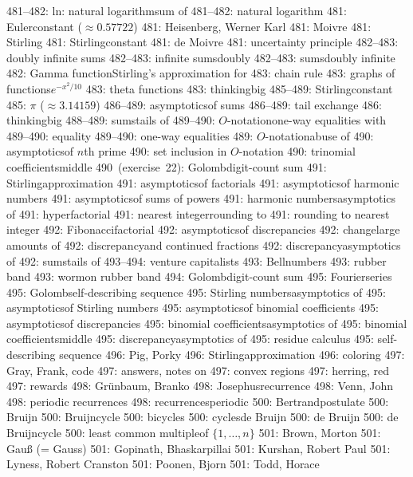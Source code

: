 481--482: ln: natural logarithm\sub sum of
481--482: natural logarithm
481: Euler\sub constant ($\approx0.57722$)
481: Heisenberg, Werner Karl
481: Moivre
481: Stirling
481: Stirling\sub constant
481: de Moivre
481: uncertainty principle
482--483: doubly infinite sums
482--483: infinite sums\sub doubly
482--483: sums\sub doubly infinite
482: Gamma function\sub Stirling's approximation for
483: chain rule
483: graphs of functions\sub $e^{-x^2\!/10}$
483: theta functions
483: thinking\sub big
485--489: Stirling\sub constant
485: $\pi$ ($\approx3.14159$)
486--489: asymptotics\sub of sums
486--489: tail exchange
486: thinking\sub big
488--489: sums\sub tails of
489--490: $O$-notation\sub one-way equalities with
489--490: equality
489--490: one-way equalities
489: $O$-notation\sub abuse of
490: asymptotics\sub of $n$th prime
490: set inclusion in $O$-notation
490: trinomial coefficients\sub middle
490~(exercise~22): Golomb\sub digit-count sum
491: Stirling\sub approximation
491: asymptotics\sub of factorials
491: asymptotics\sub of harmonic numbers
491: asymptotics\sub of sums of powers
491: harmonic numbers\sub asymptotics of
491: hyperfactorial
491: nearest integer\sub rounding to
491: rounding to nearest integer
492: Fibonacci\sub factorial
492: asymptotics\sub of discrepancies
492: change\sub large amounts of
492: discrepancy\sub and continued fractions
492: discrepancy\sub asymptotics of
492: sums\sub tails of
493--494: venture capitalists
493: Bell\sub numbers
493: rubber band
493: worm\sub on rubber band
494: Golomb\sub digit-count sum
495: Fourier\sub series
495: Golomb\sub self-describing sequence
495: Stirling numbers\sub asymptotics of
495: asymptotics\sub of Stirling numbers
495: asymptotics\sub of binomial coefficients
495: asymptotics\sub of discrepancies
495: binomial coefficients\sub asymptotics of
495: binomial coefficients\sub middle
495: discrepancy\sub asymptotics of
495: residue calculus
495: self-describing sequence
496: Pig, Porky
496: Stirling\sub approximation
496: coloring
497: Gray, Frank, code
497: answers, notes on
497: convex regions
497: herring, red
497: rewards
498: Gr\"unbaum, Branko
498: Josephus\sub recurrence
498: Venn, John
498: periodic recurrences
498: recurrences\sub periodic
500: Bertrand\sub postulate
500: Bruijn
500: Bruijn\sub cycle
500: bicycles
500: cycles\sub de Bruijn
500: de Bruijn
500: de Bruijn\sub cycle
500: least common multiple\sub of $\{1,\ldots,n\}$
501: Brown, Morton
501: Gau{\ss} (= Gauss)
501: Gopinath, Bhaskarpillai
501: Kurshan, Robert Paul
501: Lyness, Robert Cranston
501: Poonen, Bjorn
501: Todd, Horace
